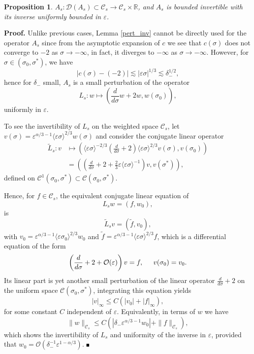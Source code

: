 \documentclass[letterpaper,11pt]{article}
\newcommand{\rmO}{\mathcal{O}}
\newcommand{\eps}{\varepsilon}
\newcommand{\lar}{ \lesssim }
\numberwithin{equation}{section}
\theoremstyle{plain}
\newtheorem{proposition}[theorem]{Proposition}
\newenvironment{Proof}[1][.]%
 {\begin{trivlist}\item[]\textbf{Proof#1 }}%
 {\hspace*{\fill}$\rule{0.3\baselineskip}{0.35\baselineskip}$\end{trivlist}}
\begin{document}
\begin{proposition}\label{inv_A_s}
$A_s : \mathcal{D}(A_s) \subset \mathcal{C}_s \to \mathcal{C}_s \times \mathbb{R}$, and $A_s$ is bounded invertible with its inverse uniformly bounded in $\eps$.
\end{proposition}
\begin{Proof}Unlike previous cases, Lemma \ref{pert_inv} cannot be directly used for the operator $A_s$ since from the asymptotic expansion of $c$ we see that $c(\sigma)$ does not converge to $-2$ as $\sigma \to -\infty$, in fact, it diverges to $-\infty$ as $\sigma \to -\infty$. 
However, for $\sigma \in (\sigma_0, \sigma^*)$, we have
\[
|c(\sigma) - (-2) | \lar |\eps\sigma|^{1/3} \lar \delta_-^{1/2},
\]
hence for $\delta_-$ small, $A_s$ is a small perturbation of the operator
\[
L_s : w \mapsto \left( \frac{d}{d\sigma}w+2w, w(\sigma_0)\right),
\]
uniformly in $\eps$.

To see the invertibility of $L_s$ on the weighted space $\mathcal{C}_s$, let $v(\sigma) = \eps^{\alpha/3-1}\langle \eps \sigma \rangle^{2/3}w(\sigma)$ and consider the conjugate linear operator
\begin{align*}
\tilde{L}_s: v &\mapsto \left( \langle \eps \sigma \rangle^{-2/3}\left(\frac{d}{d\sigma} + 2\right) \langle \eps \sigma \rangle^{2/3} v(\sigma), v(\sigma_0) \right)\\
&= \left( \left(\frac{d}{d\sigma}+2+\frac{2}{3}\eps\langle \eps\sigma \rangle^{-1}\right)  v, v(\sigma^*) \right),
\end{align*}
defined on $\mathcal{C}^1(\sigma_0, \sigma^*)\subset \mathcal{C}(\sigma_0, \sigma^*)$. 

Hence, for $f\in \mathcal{C}_s$, the equivalent conjugate linear equation of 
\[
L_s w = (f,w_0),
\]
is 
\[
\tilde{L}_s v = (\tilde{f}, v_0),
\]
with $v_0 = \eps^{\alpha/3-1}\langle \eps \sigma_0 \rangle^{2/3} w_0$ and $\tilde{f} = \eps^{\alpha/3-1}\langle \eps \sigma \rangle^{2/3}f$, which is a differential equation of the form
\[
\left( \frac{d}{d\sigma}+2+\rmO(\eps) \right) v =f, \hspace{0.2in} v(\sigma_0) = v_0.
\]
Its linear part is yet another small perturbation of the linear operator $\frac{d}{d\sigma}+2$ on the uniform space $\mathcal{C}(\sigma_0, \sigma^*)$, integrating this equation yields
\[
|v|_\infty \le C(|v_0|+|f|_\infty),
\]
for some constant $C$ independent of $\eps$. Equivalently, in terms of $w$ we have
\begin{equation}\label{linear_est:s}
\|w\|_{\mathcal{C}_s} \le C(|\delta_- \eps^{\alpha/3-1}w_0|+ \|f\|_{\mathcal{C}_s}),
\end{equation}
which shows the invertibility of $L_s$ and uniformity of the inverse in $\eps$, provided that $w_0 = \rmO(\delta_-^{-1} \eps^{1-\alpha/3})$. 
\end{Proof}
\end{document}
